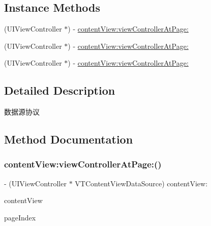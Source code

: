 \subsection*{Instance Methods}
\begin{DoxyCompactItemize}
\item 
(U\+I\+View\+Controller $\ast$) -\/ \mbox{\hyperlink{protocol_v_t_content_view_data_source_01-p_a53de70f3ccf750fcca8fc5e1285d958b}{content\+View\+:view\+Controller\+At\+Page\+:}}
\item 
(U\+I\+View\+Controller $\ast$) -\/ \mbox{\hyperlink{protocol_v_t_content_view_data_source_01-p_a53de70f3ccf750fcca8fc5e1285d958b}{content\+View\+:view\+Controller\+At\+Page\+:}}
\item 
(U\+I\+View\+Controller $\ast$) -\/ \mbox{\hyperlink{protocol_v_t_content_view_data_source_01-p_a53de70f3ccf750fcca8fc5e1285d958b}{content\+View\+:view\+Controller\+At\+Page\+:}}
\end{DoxyCompactItemize}


\subsection{Detailed Description}
数据源协议 

\subsection{Method Documentation}
\mbox{\label{protocol_v_t_content_view_data_source_01-p_a53de70f3ccf750fcca8fc5e1285d958b}} 
\subsubsection{\texorpdfstring{content\+View\+:view\+Controller\+At\+Page\+:()}{contentView:viewControllerAtPage:()}\hspace{0.1cm}{\footnotesize\ttfamily [1/3]}}
{\footnotesize\ttfamily -\/ (U\+I\+View\+Controller $\ast$ V\+T\+Content\+View\+Data\+Source) content\+View\+: \begin{DoxyParamCaption}\item[{(\mbox{\hyperlink{interface_v_t_content_view}{V\+T\+Content\+View}} $\ast$)}]{content\+View }\item[{viewControllerAtPage:(N\+S\+U\+Integer)}]{page\+Index }\end{DoxyParamCaption}}

